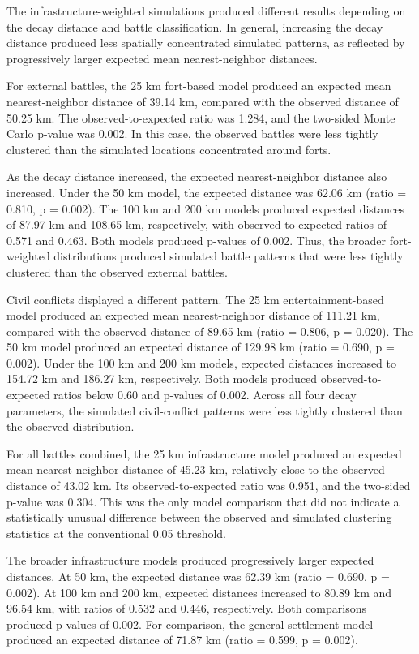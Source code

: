 \documentclass[
  letterpaper,
  DIV=11,
  numbers=noendperiod]{scrartcl}
\begin{document}
The infrastructure-weighted simulations produced different results
depending on the decay distance and battle classification. In general,
increasing the decay distance produced less spatially concentrated
simulated patterns, as reflected by progressively larger expected mean
nearest-neighbor distances.

For external battles, the 25 km fort-based model produced an expected
mean nearest-neighbor distance of 39.14 km, compared with the observed
distance of 50.25 km. The observed-to-expected ratio was 1.284, and the
two-sided Monte Carlo p-value was 0.002. In this case, the observed
battles were less tightly clustered than the simulated locations
concentrated around forts.

As the decay distance increased, the expected nearest-neighbor distance
also increased. Under the 50 km model, the expected distance was 62.06
km (ratio = 0.810, p = 0.002). The 100 km and 200 km models produced
expected distances of 87.97 km and 108.65 km, respectively, with
observed-to-expected ratios of 0.571 and 0.463. Both models produced
p-values of 0.002. Thus, the broader fort-weighted distributions
produced simulated battle patterns that were less tightly clustered than
the observed external battles.

Civil conflicts displayed a different pattern. The 25 km
entertainment-based model produced an expected mean nearest-neighbor
distance of 111.21 km, compared with the observed distance of 89.65 km
(ratio = 0.806, p = 0.020). The 50 km model produced an expected
distance of 129.98 km (ratio = 0.690, p = 0.002). Under the 100 km and
200 km models, expected distances increased to 154.72 km and 186.27 km,
respectively. Both models produced observed-to-expected ratios below
0.60 and p-values of 0.002. Across all four decay parameters, the
simulated civil-conflict patterns were less tightly clustered than the
observed distribution.

For all battles combined, the 25 km infrastructure model produced an
expected mean nearest-neighbor distance of 45.23 km, relatively close to
the observed distance of 43.02 km. Its observed-to-expected ratio was
0.951, and the two-sided p-value was 0.304. This was the only model
comparison that did not indicate a statistically unusual difference
between the observed and simulated clustering statistics at the
conventional 0.05 threshold.

The broader infrastructure models produced progressively larger expected
distances. At 50 km, the expected distance was 62.39 km (ratio = 0.690,
p = 0.002). At 100 km and 200 km, expected distances increased to 80.89
km and 96.54 km, with ratios of 0.532 and 0.446, respectively. Both
comparisons produced p-values of 0.002. For comparison, the general
settlement model produced an expected distance of 71.87 km (ratio =
0.599, p = 0.002).
\end{document}
